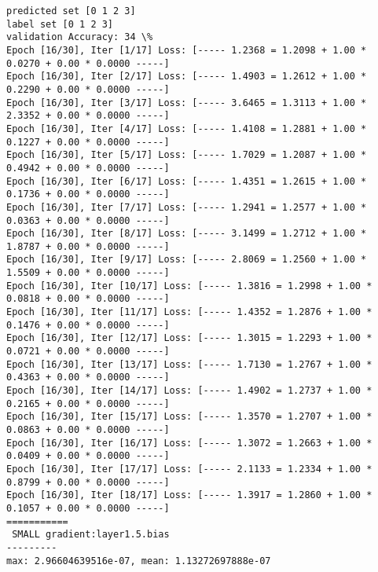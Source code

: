 \documentclass[11pt]{article}
\begin{document}
    \begin{Verbatim}[commandchars=\\\{\}]
predicted set [0 1 2 3]
label set [0 1 2 3]
validation Accuracy: 34 \%
Epoch [16/30], Iter [1/17] Loss: [----- 1.2368 = 1.2098 + 1.00 * 0.0270 + 0.00 * 0.0000 -----]
Epoch [16/30], Iter [2/17] Loss: [----- 1.4903 = 1.2612 + 1.00 * 0.2290 + 0.00 * 0.0000 -----]
Epoch [16/30], Iter [3/17] Loss: [----- 3.6465 = 1.3113 + 1.00 * 2.3352 + 0.00 * 0.0000 -----]
Epoch [16/30], Iter [4/17] Loss: [----- 1.4108 = 1.2881 + 1.00 * 0.1227 + 0.00 * 0.0000 -----]
Epoch [16/30], Iter [5/17] Loss: [----- 1.7029 = 1.2087 + 1.00 * 0.4942 + 0.00 * 0.0000 -----]
Epoch [16/30], Iter [6/17] Loss: [----- 1.4351 = 1.2615 + 1.00 * 0.1736 + 0.00 * 0.0000 -----]
Epoch [16/30], Iter [7/17] Loss: [----- 1.2941 = 1.2577 + 1.00 * 0.0363 + 0.00 * 0.0000 -----]
Epoch [16/30], Iter [8/17] Loss: [----- 3.1499 = 1.2712 + 1.00 * 1.8787 + 0.00 * 0.0000 -----]
Epoch [16/30], Iter [9/17] Loss: [----- 2.8069 = 1.2560 + 1.00 * 1.5509 + 0.00 * 0.0000 -----]
Epoch [16/30], Iter [10/17] Loss: [----- 1.3816 = 1.2998 + 1.00 * 0.0818 + 0.00 * 0.0000 -----]
Epoch [16/30], Iter [11/17] Loss: [----- 1.4352 = 1.2876 + 1.00 * 0.1476 + 0.00 * 0.0000 -----]
Epoch [16/30], Iter [12/17] Loss: [----- 1.3015 = 1.2293 + 1.00 * 0.0721 + 0.00 * 0.0000 -----]
Epoch [16/30], Iter [13/17] Loss: [----- 1.7130 = 1.2767 + 1.00 * 0.4363 + 0.00 * 0.0000 -----]
Epoch [16/30], Iter [14/17] Loss: [----- 1.4902 = 1.2737 + 1.00 * 0.2165 + 0.00 * 0.0000 -----]
Epoch [16/30], Iter [15/17] Loss: [----- 1.3570 = 1.2707 + 1.00 * 0.0863 + 0.00 * 0.0000 -----]
Epoch [16/30], Iter [16/17] Loss: [----- 1.3072 = 1.2663 + 1.00 * 0.0409 + 0.00 * 0.0000 -----]
Epoch [16/30], Iter [17/17] Loss: [----- 2.1133 = 1.2334 + 1.00 * 0.8799 + 0.00 * 0.0000 -----]
Epoch [16/30], Iter [18/17] Loss: [----- 1.3917 = 1.2860 + 1.00 * 0.1057 + 0.00 * 0.0000 -----]
===========
 SMALL gradient:layer1.5.bias
---------
max: 2.96604639516e-07, mean: 1.13272697888e-07

    \end{Verbatim}

    \begin{center}
    \end{center}
    { \hspace*{\fill} \\}
    
    \begin{center}
    \end{center}
    { \hspace*{\fill} \\}
    
\end{document}
